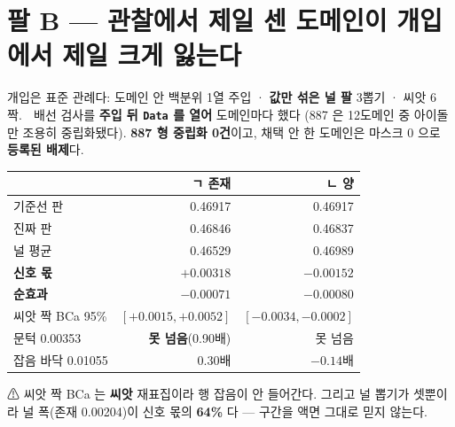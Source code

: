 \documentclass[10pt]{article}
\begin{document}
\section{팔 B --- 관찰에서 제일 센 도메인이 개입에서 제일 크게 잃는다}

개입은 표준 관례다: 도메인 안 백분위 1열 주입 · \textbf{값만 섞은 널 팔} 3뽑기 ·
씨앗 6 짝. 🔴 배선 검사를 \textbf{주입 뒤 \texttt{Data} 를 열어} 도메인마다 했다
(887 은 12도메인 중 아이돌만 조용히 중립화됐다). \textbf{887 형 중립화 0건}이고,
채택 안 한 도메인은 마스크 0 으로 \textbf{등록된 배제}다.

\begin{table}[h]\centering\small
\begin{tabular}{lrr}
\hline
 & ㄱ 존재 & ㄴ 양 \\
\hline
기준선 판 & 0.46917 & 0.46917 \\
진짜 판 & 0.46846 & 0.46837 \\
널 평균 & 0.46529 & 0.46989 \\
\textbf{신호 몫} & $+0.00318$ & $\mathbf{-0.00152}$ \\
\textbf{순효과} & $-0.00071$ & $-0.00080$ \\
씨앗 짝 BCa 95\% & $[+0.0015,+0.0052]$ & $[-0.0034,-0.0002]$ \\
문턱 0.00353 & \textbf{못 넘음}(0.90배) & 못 넘음 \\
잡음 바닥 0.01055 & 0.30배 & $-0.14$배 \\
\hline
\end{tabular}
\end{table}


⚠ 씨앗 짝 BCa 는 \textbf{씨앗} 재표집이라 행 잡음이 안 들어간다. 그리고 널 뽑기가
셋뿐이라 널 폭(존재 0.00204)이 신호 몫의 \textbf{64\%} 다 --- 구간을 액면 그대로
믿지 않는다.
\end{document}
